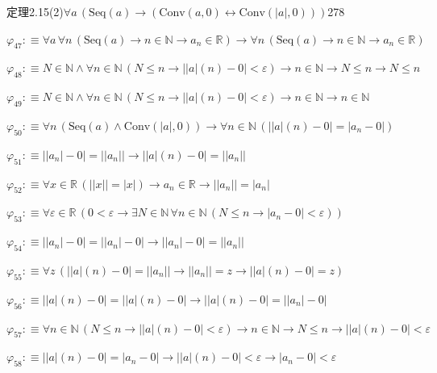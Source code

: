 \begin{fullproof}{定理2.15(2)}{$\forall a\,(\mathrm{Seq}(a) \to (\mathrm{Conv}(a,0) \leftrightarrow \mathrm{Conv}(\lvert a \rvert,0)))$}{278}
\begin{abbrevlist}
\item $\varphi_{47} :\equiv \forall a\,\forall n\,(\mathrm{Seq}(a) \to n \in \mathbb{N} \to a_{n} \in \mathbb{R}) \to \forall n\,(\mathrm{Seq}(a) \to n \in \mathbb{N} \to a_{n} \in \mathbb{R})$
\item $\varphi_{48} :\equiv N \in \mathbb{N} \land \forall n \in \mathbb{N}\,(N \leq n \to \lvert \lvert a \rvert(n) - 0 \rvert < \varepsilon) \to n \in \mathbb{N} \to N \leq n \to N \leq n$
\item $\varphi_{49} :\equiv N \in \mathbb{N} \land \forall n \in \mathbb{N}\,(N \leq n \to \lvert \lvert a \rvert(n) - 0 \rvert < \varepsilon) \to n \in \mathbb{N} \to n \in \mathbb{N}$
\item $\varphi_{50} :\equiv \forall n\,(\mathrm{Seq}(a) \land \mathrm{Conv}(\lvert a \rvert,0)) \to \forall n \in \mathbb{N}\,(\lvert \lvert a \rvert(n) - 0 \rvert = \lvert a_{n} - 0 \rvert)$
\item $\varphi_{51} :\equiv \lvert \lvert a_{n} \rvert - 0 \rvert = \lvert \lvert a_{n} \rvert \rvert \to \lvert \lvert a \rvert(n) - 0 \rvert = \lvert \lvert a_{n} \rvert \rvert$
\item $\varphi_{52} :\equiv \forall x \in \mathbb{R}\,(\lvert \lvert x \rvert \rvert = \lvert x \rvert) \to a_{n} \in \mathbb{R} \to \lvert \lvert a_{n} \rvert \rvert = \lvert a_{n} \rvert$
\item $\varphi_{53} :\equiv \forall \varepsilon \in \mathbb{R}\,(0 < \varepsilon \to \exists N \in \mathbb{N}\,\forall n \in \mathbb{N}\,(N \leq n \to \lvert a_{n} - 0 \rvert < \varepsilon))$
\item $\varphi_{54} :\equiv \lvert \lvert a_{n} \rvert - 0 \rvert = \lvert \lvert a_{n} \rvert - 0 \rvert \to \lvert \lvert a_{n} \rvert - 0 \rvert = \lvert \lvert a_{n} \rvert \rvert$
\item $\varphi_{55} :\equiv \forall z\,(\lvert \lvert a \rvert(n) - 0 \rvert = \lvert \lvert a_{n} \rvert \rvert \to \lvert \lvert a_{n} \rvert \rvert = z \to \lvert \lvert a \rvert(n) - 0 \rvert = z)$
\item $\varphi_{56} :\equiv \lvert \lvert a \rvert(n) - 0 \rvert = \lvert \lvert a \rvert(n) - 0 \rvert \to \lvert \lvert a \rvert(n) - 0 \rvert = \lvert \lvert a_{n} \rvert - 0 \rvert$
\item $\varphi_{57} :\equiv \forall n \in \mathbb{N}\,(N \leq n \to \lvert \lvert a \rvert(n) - 0 \rvert < \varepsilon) \to n \in \mathbb{N} \to N \leq n \to \lvert \lvert a \rvert(n) - 0 \rvert < \varepsilon$
\item $\varphi_{58} :\equiv \lvert \lvert a \rvert(n) - 0 \rvert = \lvert a_{n} - 0 \rvert \to \lvert \lvert a \rvert(n) - 0 \rvert < \varepsilon \to \lvert a_{n} - 0 \rvert < \varepsilon$

\end{abbrevlist}
\end{fullproof}
